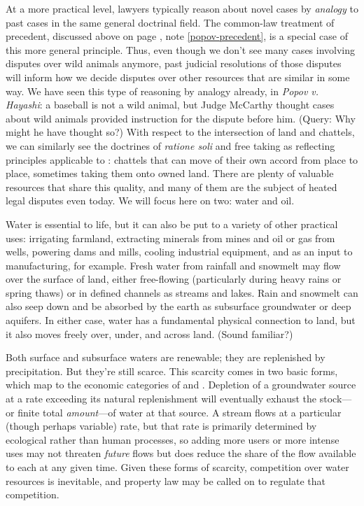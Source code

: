 At a more practical level, lawyers typically reason about novel cases by
\textit{analogy} to past cases in the same general doctrinal field. The
common-law treatment of precedent, discussed above on page
\pageref{popov-precedent}, note \ref{popov-precedent}, is a special case of
this more general principle. Thus, even though we don't see many cases involving
disputes over wild animals anymore, past judicial resolutions of those disputes
will inform how we decide disputes over other resources that are similar in some
way. We have seen this type of reasoning by analogy already, in \textit{Popov v.
Hayashi}: a baseball is not a wild animal, but Judge McCarthy thought cases
about wild animals provided instruction for the dispute before him. (Query: Why
might he have thought so?) With respect to the intersection of land and
chattels, we can similarly see
the doctrines of
\textit{ratione soli} and free taking as reflecting principles applicable to
: chattels that can move of their own accord from
place to place, sometimes taking them onto owned land. There are plenty of
valuable resources that share this quality, and many of them are the subject of
heated legal disputes even today. We will focus here on two: water and oil.


Water is essential to life, but it can also be put to a variety of other
practical uses: irrigating farmland, extracting minerals from mines and oil or
gas from wells, powering dams and mills, cooling industrial equipment, and as an
input to manufacturing, for example. Fresh water from rainfall and snowmelt may
flow over the surface of land, either free-flowing (particularly during heavy
rains or spring thaws) or in defined channels as streams and lakes. Rain and
snowmelt can also seep down and be absorbed by the earth as subsurface
groundwater or deep aquifers. In either case, water has a fundamental physical
connection to land, but it also moves freely over, under, and across land.
(Sound familiar?)

Both surface and subsurface waters are renewable; they are replenished by
precipitation. But they're still scarce. This scarcity comes in two basic forms,
which map to the economic categories of  and .
Depletion of a groundwater source at a rate exceeding its natural replenishment
will eventually exhaust the stock---or finite total
\textit{amount}---of water at that source. A stream flows at a
particular (though perhaps variable) rate, but that rate is primarily
determined by ecological rather than human processes, so adding more users or
more intense uses may not threaten \textit{future} flows but does reduce the
share of the flow available to each at any given time. Given these forms of
scarcity, competition over water resources is inevitable, and property law may
be called on to regulate that competition.

